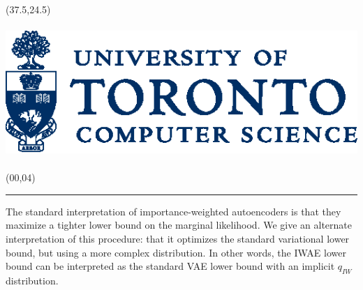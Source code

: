 \documentclass{article}
\def\CHead#1{\begin{center}\noindent{\LARGE\color{DarkBlue} #1}\end{center}}
\renewcommand{\LARGE}{\fontsize{43}{54}\selectfont}
\begin{document}
\begin{textblock}{8}(37.5,24.5)
\begin{center}
\includegraphics[height=5cm]{dcs_logo.eps}
\end{center}
\end{textblock}

















\begin{textblock}{10}(00,04)
\CHead{Main Idea} 
\hrule
\vspace{3mm}
The standard interpretation of importance-weighted autoencoders is that they maximize a tighter lower bound on the marginal likelihood.
We give an alternate interpretation of this procedure: that it optimizes the standard variational lower bound, but using a more complex distribution. In other words, the IWAE lower bound can be interpreted as the standard VAE lower bound with an implicit $q_{IW}$ distribution. 
\end{textblock}
\end{document}
